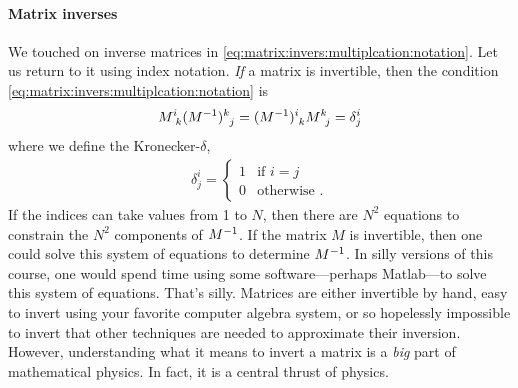 \documentclass[12pt, oneside]{report}    %
\begin{document}
\paragraph{Matrix inverses}
We touched on inverse matrices in \eqref{eq:matrix:invers:multiplcation:notation}. Let us return to it using index notation. \emph{If} a matrix is invertible, then the condition \eqref{eq:matrix:invers:multiplcation:notation} is
\begin{align}
    M\aij{i}{k}(M\inv)\aij{k}{j} = (M\inv)\aij{i}{k}M\aij{k}{j} = \delta^i_j
    \label{eq:index:matrix:inverse}
\end{align}
where we define the Kronecker-$\delta$,
\begin{align}
    \delta^i_j = \begin{cases}
    1 & \text{if } i=j \\
    0 & \text{otherwise .}
    \end{cases}
    \label{eq:kronecker:delta}
\end{align}
If the indices can take values from 1 to $N$, then there are $N^2$ equations to constrain the $N^2$ components of $M^{-1}$. If the matrix $M$ is invertible, then one could solve this system of equations to determine $M^{-1}$. In silly versions of this course, one would spend time using some software---perhaps Matlab---to solve this system of equations. That's silly. Matrices are either invertible by hand, easy to invert using your favorite computer algebra system, or so hopelessly impossible to invert that other techniques are needed to approximate their inversion. However, understanding what it means to invert a matrix is a \emph{big} part of mathematical physics. In fact, it is a central thrust of physics.
\end{document}
